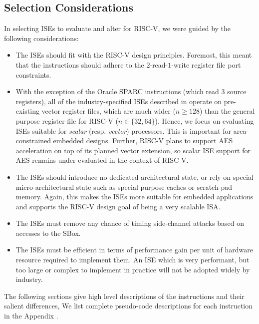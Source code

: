 
\subsection{Selection Considerations}

In selecting ISEs to evaluate and alter for RISC-V, we were guided by the
following considerations:

\begin{itemize}
\item The ISEs should fit with the RISC-V design principles.
      Foremost, this meant that the instructions should adhere to
      the $2$-read-$1$-write register file port constraints.
\item With the exception of the Oracle SPARC
      instructions (which read $3$ source registers),
      all of the industry-specified ISEs described in
       operate on pre-existing vector
      register files, which are much wider ($n\ge128$) than the
      general purpose register file for RISC-V ($n\in\{32,64\}$).
      Hence, we focus on evaluating ISEs suitable for {\em scalar}
      (resp. {\em vector}) processors.
      This is important for area-constrained embedded designs.
      Further, RISC-V plans to support AES acceleration on top of
      its planned vector extension, so scalar ISE support for
      AES remains under-evaluated in the context of RISC-V.
\item The ISEs should introduce no dedicated architectural state, or
      rely on special micro-architectural state such as special
      purpose caches or scratch-pad memory.
      Again, this makes the ISEs more suitable for embedded
      applications and supports the RISC-V design goal of being
      a very scalable ISA.
\item The ISEs must remove any chance of timing side-channel attacks
      based on accesses to the SBox.
\item The ISEs must be efficient in terms of performance gain per
      unit of hardware resource required to implement them.
      An ISE which is very performant, but too large or complex to implement
      in practice will not be adopted widely by industry.
\end{itemize}

The following sections give high level descriptions of the
instructions and their salient differences,
We list complete pseudo-code descriptions for each instruction
in the Appendix .

